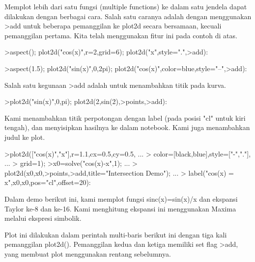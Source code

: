 \documentclass{article}
\begin{document}
\begin{eulernotebook}
\begin{eulercomment}
\begin{eulercomment}
\begin{eulercomment}
\begin{eulercomment}
\begin{eulercomment}
\begin{eulercomment}
\begin{eulercomment}
Memplot lebih dari satu fungsi (multiple functions) ke dalam satu
jendela dapat dilakukan dengan berbagai cara. Salah satu caranya
adalah dengan menggunakan \textgreater{}add untuk beberapa pemanggilan ke plot2d
secara bersamaan, kecuali pemanggilan pertama. Kita telah menggunakan
fitur ini pada contoh di atas.
\end{eulercomment}
\begin{eulerprompt}
>aspect(); plot2d("cos(x)",r=2,grid=6); plot2d("x",style=".",>add):
\end{eulerprompt}
\begin{eulerprompt}
>aspect(1.5); plot2d("sin(x)",0,2pi); plot2d("cos(x)",color=blue,style="--",>add):
\end{eulerprompt}
\begin{eulercomment}
Salah satu kegunaan \textgreater{}add adalah untuk menambahkan titik pada kurva.
\end{eulercomment}
\begin{eulerprompt}
>plot2d("sin(x)",0,pi); plot2d(2,sin(2),>points,>add):
\end{eulerprompt}
\begin{eulercomment}
Kami menambahkan titik perpotongan dengan label (pada posisi "cl"
untuk kiri tengah), dan menyisipkan hasilnya ke dalam notebook. Kami
juga menambahkan judul ke plot.
\end{eulercomment}
\begin{eulerprompt}
>plot2d(["cos(x)","x"],r=1.1,cx=0.5,cy=0.5, ...
>  color=[black,blue],style=["-","."], ...
>  grid=1);
>x0=solve("cos(x)-x",1);  ...
>  plot2d(x0,x0,>points,>add,title="Intersection Demo");  ...
>  label("cos(x) = x",x0,x0,pos="cl",offset=20):
\end{eulerprompt}
\begin{eulercomment}
Dalam demo berikut ini, kami memplot fungsi sinc(x)=sin(x)/x dan
ekspansi Taylor ke-8 dan ke-16. Kami menghitung ekspansi ini
menggunakan Maxima melalui ekspresi simbolik.

Plot ini dilakukan dalam perintah multi-baris berikut ini dengan tiga
kali pemanggilan plot2d(). Pemanggilan kedua dan ketiga memiliki set
flag \textgreater{}add, yang membuat plot menggunakan rentang sebelumnya.


\end{eulercomment}
\end{eulercomment}
\end{eulercomment}
\end{eulercomment}
\end{eulercomment}
\end{eulercomment}
\end{eulercomment}
\end{eulernotebook}
\end{document}
